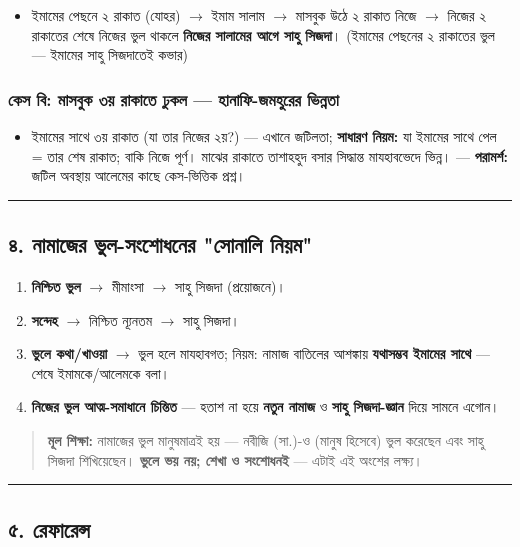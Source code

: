 \begin{itemize}
\item ইমামের পেছনে ২ রাকাত (যোহর) $\rightarrow$ ইমাম সালাম $\rightarrow$ মাসবুক উঠে ২ রাকাত নিজে $\rightarrow$ নিজের ২ রাকাতের শেষে নিজের ভুল থাকলে \textbf{নিজের সালামের আগে সাহু সিজদা}। (ইমামের পেছনের ২ রাকাতের ভুল — ইমামের সাহু সিজদাতেই কভার)
\end{itemize}
\subsubsection*{কেস বি: মাসবুক ৩য় রাকাতে ঢুকল — হানাফি-জমহুরের ভিন্নতা}

\begin{itemize}
\item ইমামের সাথে ৩য় রাকাত (যা তার নিজের ২য়?) — এখানে জটিলতা; \textbf{সাধারণ নিয়ম:} যা ইমামের সাথে পেল = তার শেষ রাকাত; বাকি নিজে পূর্ণ। মাঝের রাকাতে তাশাহহুদ বসার সিদ্ধান্ত মাযহাবভেদে ভিন্ন। — \textbf{পরামর্শ:} জটিল অবস্থায় আলেমের কাছে কেস-ভিত্তিক প্রশ্ন।
\end{itemize}
\medskip\hrule\medskip

\subsection*{৪. নামাজের ভুল-সংশোধনের "সোনালি নিয়ম"}

\begin{enumerate}
\item \textbf{নিশ্চিত ভুল} $\rightarrow$ মীমাংসা $\rightarrow$ সাহু সিজদা (প্রয়োজনে)।
\item \textbf{সন্দেহ} $\rightarrow$ নিশ্চিত ন্যূনতম $\rightarrow$ সাহু সিজদা।
\item \textbf{ভুলে কথা/খাওয়া} $\rightarrow$ ভুল হলে মাযহাবগত; নিয়ম: নামাজ বাতিলের আশঙ্কায় \textbf{যথাসম্ভব ইমামের সাথে} — শেষে ইমামকে/আলেমকে বলা।
\item \textbf{নিজের ভুল আত্ম-সমাধানে চিন্তিত} — হতাশ না হয়ে \textbf{নতুন নামাজ} ও \textbf{সাহু সিজদা-জ্ঞান} দিয়ে সামনে এগোন।
\end{enumerate}
\begin{quote}
\textbf{মূল শিক্ষা:} নামাজের ভুল মানুষমাত্রই হয় — নবীজি (সা.)-ও (মানুষ হিসেবে) ভুল করেছেন এবং সাহু সিজদা শিখিয়েছেন। \textbf{ভুলে ভয় নয়; শেখা ও সংশোধনই} — এটাই এই অংশের লক্ষ্য।
\end{quote}

\medskip\hrule\medskip

\subsection*{৫. রেফারেন্স}

